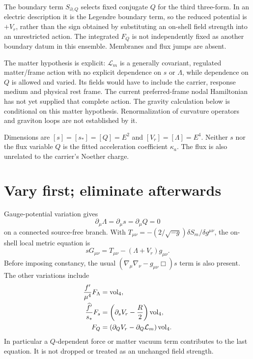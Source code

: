 \documentclass[11pt]{article}
\begin{document}
The boundary term $S_{\partial,Q}$ selects fixed conjugate $Q$ for the
third three-form. In an electric description it is the Legendre boundary
term, so the reduced potential is $+V_r$, rather than the sign obtained by
substituting an on-shell field strength into an unrestricted action.
The integrated $F_Q$ is not independently fixed as another boundary datum
in this ensemble. Membranes and flux jumps are absent.

The matter hypothesis is explicit: $\mathcal L_m$ is a generally covariant,
regulated matter/frame action with no explicit dependence on $s$ or
$\Lambda$, while dependence on $Q$ is allowed and varied. Its fields
would have to include the carrier, response medium and physical rest frame.
The current preferred-frame nodal Hamiltonian has not yet supplied that
complete action. The gravity calculation below is conditional on this
matter hypothesis. Renormalization of curvature operators and graviton
loops are not established by it.

Dimensions are $[s]=[s_*]=[Q]=E^2$ and $[V_r]=[\Lambda]=E^4$.
Neither $s$ nor the flux variable $Q$ is the fitted acceleration coefficient
$\kappa_a$. The flux is also unrelated to the carrier's Noether charge.

\section{Vary first; eliminate afterwards}
Gauge-potential variation gives
\begin{equation}
 \partial_\mu\Lambda=\partial_\mu s=\partial_\mu Q=0
\end{equation}
on a connected source-free branch. With
$T_{\mu\nu}=-(2/\sqrt{-g})\delta S_m/\delta g^{\mu\nu}$, the
on-shell local metric equation is
\begin{equation}
 sG_{\mu\nu}=T_{\mu\nu}-(\Lambda+V_r)g_{\mu\nu}.
 \label{pf:metric}
\end{equation}
Before imposing constancy, the usual
$(\nabla_\mu\nabla_\nu-g_{\mu\nu}\Box)s$ term is also present.
The other variations include
\begin{align}
 {f'\over\mu^4}F_\Lambda&=\mathrm{vol}_4,\\
 {\widehat f'\over s_*}F_s
      &=\left(\partial_s V_r-{R\over2}\right)\mathrm{vol}_4,\\
 F_Q&=\left(\partial_QV_r-\partial_Q\mathcal L_m\right)
                                                  \mathrm{vol}_4.
 \label{pf:auxiliary}
\end{align}
In particular a $Q$-dependent force or matter vacuum term contributes to
the last equation. It is not dropped or treated as an unchanged field
strength.
\end{document}
